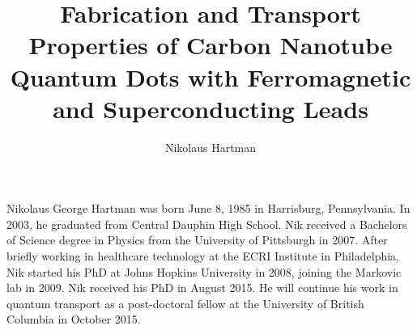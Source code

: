 \documentclass[12pt,oneside,final]{thesis}
\begin{document}
\title{Fabrication and Transport Properties of Carbon Nanotube Quantum Dots with Ferromagnetic and Superconducting Leads}
\author{Nikolaus Hartman}
\dissertation
\doctorphilosophy
\copyrightnotice %

\appendix





\begin{vita}

Nikolaus George Hartman was born June 8, 1985 in Harrisburg, Pennsylvania. In 2003, he graduated from Central Dauphin High School. Nik received a Bachelors of Science degree in Physics from the University of Pittsburgh in 2007. After briefly working in healthcare technology at the ECRI Institute in Philadelphia, Nik started his PhD at Johns Hopkins University in 2008, joining the Markovic lab in 2009. Nik received his PhD in August 2015. He will continue his work in quantum transport as a post-doctoral fellow at the University of British Columbia in October 2015.

\end{vita}
\end{document}

